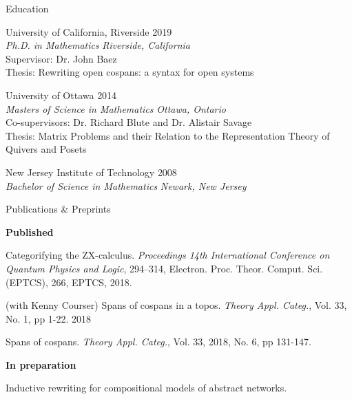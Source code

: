 \documentclass{Resume} %
\begin{document}

\begin{rSection}{Education}

{\sc University of California, Riverside} 
\hfill 
{2019} \\ 
\textit{Ph.D. in Mathematics} 
\hfill 
{\em Riverside, California} \\
Supervisor: Dr. John Baez \\
Thesis: Rewriting open cospans: a syntax for open systems

{\sc University of Ottawa} 
\hfill 
{2014} \\ 
\textit{Masters of Science in Mathematics}
\hfill
{\em Ottawa, Ontario} \\
Co-supervisors: Dr. Richard Blute and Dr. Alistair Savage \\
Thesis: {Matrix Problems and their Relation to the Representation Theory of Quivers and Posets }

{\sc New Jersey Institute of Technology} 
\hfill 
{2008} \\ 
\textit{Bachelor of Science in Mathematics} 
\hfill
{\em Newark, New Jersey}

\end{rSection}






\begin{rSection}{Publications \& Preprints}

  \textbf{Published}
  
  Categorifying the ZX-calculus.  \emph{Proceedings 14th International
    Conference on Quantum Physics and Logic}, 294--314,
  Electron. Proc. Theor. Comput. Sci. (EPTCS), 266, EPTCS, 2018.
  
  (with Kenny Courser) Spans of cospans in a topos. \emph{Theory
    Appl. Categ.}, Vol. 33, No. 1, pp 1-22. 2018
	
  Spans of cospans.  \emph{Theory Appl. Categ.}, Vol. 33, 2018, No. 6,
  pp 131-147.

  \textbf{In preparation}
  
  Inductive rewriting for compositional models of abstract
  networks.
  
\end{rSection}
\end{document}
